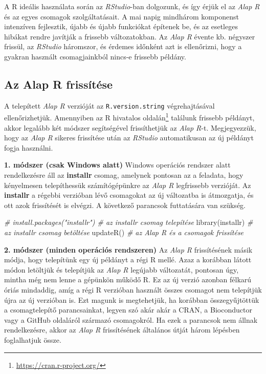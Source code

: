 \documentclass[
]{book}
\newenvironment{Shaded}{\begin{snugshade}}{\end{snugshade}}
\newcommand{\CommentTok}[1]{\textcolor[rgb]{0.56,0.35,0.01}{\textit{#1}}}
\newcommand{\FunctionTok}[1]{\textcolor[rgb]{0.00,0.00,0.00}{#1}}
\newcommand{\NormalTok}[1]{#1}
\DeclareRobustCommand{\href}[2]{#2\footnote{\url{#1}}}
\renewcommand{\href}[2]{#2\footnote{\url{#1}}}
\begin{document}
A R ideális használata során az \emph{RStudio}-ban dolgozunk, és így érjük el az \emph{Alap R} és az egyes csomagok szolgáltatásait. A mai napig mindhárom komponenst intenzíven fejlesztik, újabb és újabb funkciókat építenek be, és az esetleges hibákat rendre javítják a frissebb változatokban. Az \emph{Alap R} évente kb. négyszer frissül, az \emph{RStudio} háromszor, és érdemes időnként azt is ellenőrizni, hogy a gyakran használt csomagjainkból nincs-e frissebb példány.

\hypertarget{az-alap-r-frissuxedtuxe9se}{%
\subsection{Az Alap R frissítése}\label{az-alap-r-frissuxedtuxe9se}}

A telepített \emph{Alap R} verzióját az \texttt{R.version.string} végrehajtásával ellenőrizhetjük. Amennyiben az R hivatalos \href{https://cran.r-project.org/}{oldalán} találunk frissebb példányt, akkor legalább két módszer segítségével frissíthetjük az \emph{Alap R}-t. Megjegyezzük, hogy az \emph{Alap R} sikeres frissítése után az \emph{RStudio} automatikusan az új példányt fogja használni.

\textbf{1. módszer (csak Windows alatt)} Windows operációs rendszer alatt rendelkezésre áll az \textbf{installr} csomag, amelynek pontosan az a feladata, hogy kényelmesen telepíthessük számítógépünkre az \emph{Alap R} legfrissebb verzióját. Az \textbf{installr} a régebbi verzióban lévő csomagokat az új változatba is átmozgatja, és ott azok frissítését is elvégzi. A következő parancsok futtatására van szükség.

\begin{Shaded}
\begin{Highlighting}[]
\CommentTok{\# install.packages("installr") \# az installr csomag telepítése}
\FunctionTok{library}\NormalTok{(installr)              }\CommentTok{\# az installr csomag betöltése}
\FunctionTok{updateR}\NormalTok{()                      }\CommentTok{\# az Alap R és a csomagok frissítése}
\end{Highlighting}
\end{Shaded}

\textbf{2. módszer (minden operációs rendszeren)} Az \emph{Alap R} frissítésének másik módja, hogy telepítünk egy új példányt a régi R mellé. Azaz a korábban látott módon letöltjük és telepítjük az \emph{Alap R} legújabb változatát, pontosan úgy, mintha még nem lenne a gépünkön működő R. Ez az új verzió azonban félkarú óriás mindaddig, amíg a régi R verzióban használt összes csomagot nem telepítjük újra az új verzióban is. Ezt magunk is megtehetjük, ha korábban összegyűjtöttük a csomagtelepítő parancsainkat, legyen szó akár akár a CRAN, a Bioconductor vagy a GitHub oldaláról származó csomagokról. Ha ezek a parancsok nem állnak rendelkezésre, akkor az \emph{Alap R} frissítésének általános útját három lépésben foglalhatjuk össze.
\end{document}
